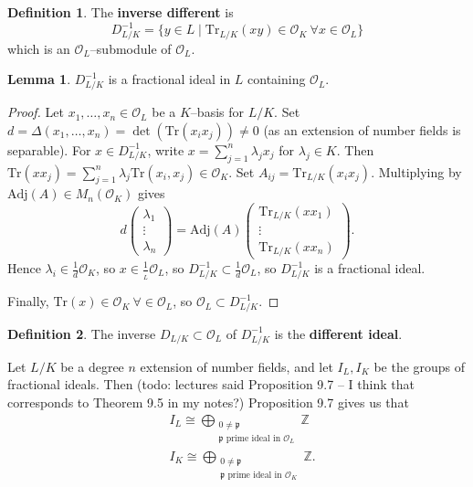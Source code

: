 \documentclass{article}
\theoremstyle{definition}
\newtheorem{lemma}[theorem]{Lemma}
\newtheorem{defn}{Definition}[section]
\begin{document}
\begin{defn}
    The \textbf{inverse different} is $$D^{-1}_{L/K} = \{y \in L \mid \text{Tr}_{L/K}(xy) \in \mathcal{O}_K ~\forall x \in \mathcal{O}_L\}$$
    which is an $\mathcal{O}_L$--submodule of $\mathcal{O}_L$.
\end{defn}
\begin{lemma}
    $D^{-1}_{L/K}$ is a fractional ideal in $L$ containing $\mathcal{O}_L$.
\end{lemma}
\begin{proof}
    Let $x_1,\ldots,x_n \in \mathcal{O}_L$ be a $K$--basis for $L/K$. Set $d = \Delta(x_1,\ldots,x_n) = \det(\text{Tr}(x_ix_j)) \neq 0$ (as an extension of number fields is separable). For $x \in D^{-1}_{L/K}$, write $x = \sum_{j=1}^{n} \lambda_j x_j$ for $\lambda_j \in K$. Then $\text{Tr}(xx_j)=\sum_{j=1}^{n} \lambda_j \text{Tr}(x_i,x_j) \in\mathcal{O}_K$. Set $A_{ij} = \text{Tr}_{L/K}(x_i x_j)$. Multiplying by $\text{Adj}(A) \in M_{n}(\mathcal{O}_K)$ gives \[
    d \begin{pmatrix} \lambda_1 \\ \vdots \\ \lambda_n \end{pmatrix} = \text{Adj}(A) \begin{pmatrix} \text{Tr}_{L/K}(x x_1) \\ \vdots \\ \text{Tr}_{L/K}(x x_n) \end{pmatrix}.
    \]
    Hence $\lambda_i \in \frac{1}{d}\mathcal{O}_K$, so $x \in \frac{1}{_L} \mathcal{O}_L$, so $D^{-1}_{L/K} \subset \frac{1}{d}\mathcal{O}_L$, so $D^{-1}_{L/K}$ is a fractional ideal.
    \vspace{1mm}
     
    Finally, $\text{Tr}(x) \in \mathcal{O}_K ~\forall \in \mathcal{O}_L$, so $\mathcal{O}_L \subset D^{-1}_{L/K}$.
\end{proof}
\begin{defn}
    The inverse $D_{L/K} \subset \mathcal{O}_L$ of $D^{-1}_{L/K}$ is the \textbf{different ideal}.
\end{defn}


Let $L/K$ be a degree $n$ extension of number fields, and let $I_L, I_K$ be the groups of fractional ideals. Then (todo: lectures said Proposition 9.7 -- I think that corresponds to Theorem 9.5 in my notes?) Proposition 9.7 gives us that 
\begin{align*}
    &I_L \cong \bigoplus_{\substack{0 \neq \mathfrak{p}\\\mathfrak{p} \text{ prime ideal in }\mathcal{O}_L}} \mathbb{Z} \\
    &I_K \cong \bigoplus_{\substack{0 \neq \mathfrak{p}\\\mathfrak{p} \text{ prime ideal in }\mathcal{O}_K}} \mathbb{Z}.
\end{align*}
\end{document}
